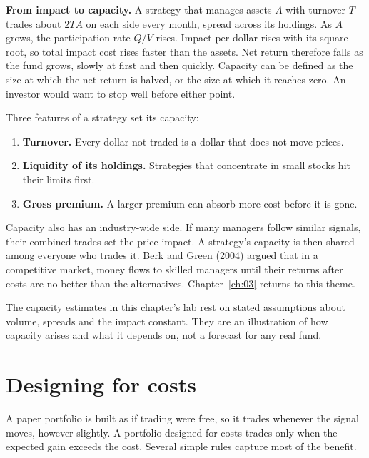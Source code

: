 \textbf{From impact to capacity.} A strategy that manages assets $A$ with turnover $T$ trades about $2TA$ on each side every month, spread across its holdings. As $A$ grows, the participation rate $Q/V$ rises. Impact per dollar rises with its square root, so total impact cost rises faster than the assets. Net return therefore falls as the fund grows, slowly at first and then quickly. Capacity can be defined as the size at which the net return is halved, or the size at which it reaches zero. An investor would want to stop well before either point.

Three features of a strategy set its capacity:

\begin{enumerate}
  \item \textbf{Turnover.} Every dollar not traded is a dollar that does not move prices.
  \item \textbf{Liquidity of its holdings.} Strategies that concentrate in small stocks hit their limits first.
  \item \textbf{Gross premium.} A larger premium can absorb more cost before it is gone.
\end{enumerate}

Capacity also has an industry-wide side. If many managers follow similar signals, their combined trades set the price impact. A strategy's capacity is then shared among everyone who trades it. Berk and Green (2004) argued that in a competitive market, money flows to skilled managers until their returns after costs are no better than the alternatives. Chapter~\ref{ch:03} returns to this theme.

The capacity estimates in this chapter's lab rest on stated assumptions about volume, spreads and the impact constant. They are an illustration of how capacity arises and what it depends on, not a forecast for any real fund.

\section{Designing for costs}
\label{sec:17-design}

A paper portfolio is built as if trading were free, so it trades whenever the signal moves, however slightly. A portfolio designed for costs trades only when the expected gain exceeds the cost. Several simple rules capture most of the benefit.

